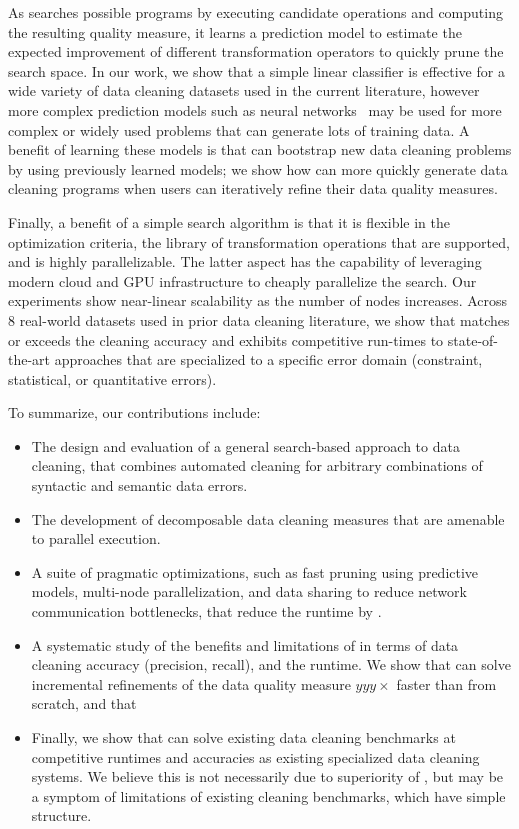 As \sys searches possible programs by executing candidate operations and computing the resulting quality measure, it learns a prediction model to estimate the expected improvement of different transformation operators to quickly prune the search space.  In our work, we show that a simple linear classifier is effective for a wide variety of data cleaning datasets used in the current literature, however more complex prediction models such as neural networks~\cite{} may be used for more complex or widely used problems that can generate lots of training data.   A benefit of learning these models is that \sys can bootstrap new data cleaning problems by using previously learned models; we show how \sys can more quickly generate data cleaning programs when users can iteratively refine their data quality measures.

Finally, a benefit of a simple search algorithm is that it is flexible in the optimization criteria, the library of transformation operations that are supported, and is highly parallelizable.  The latter aspect has the capability of leveraging modern cloud and GPU infrastructure to cheaply parallelize the search.  Our experiments show near-linear scalability as the number of nodes increases.
Across 8 real-world datasets used in prior data cleaning literature, we show that \sys matches or exceeds the cleaning accuracy and exhibits competitive run-times to state-of-the-art approaches that are specialized to a specific error domain (constraint, statistical, or quantitative errors).  


To summarize, our contributions include:
\begin{itemize}[leftmargin=*, topsep=0mm, itemsep=0mm]
  \item The design and evaluation of a general search-based approach to data cleaning, that combines automated cleaning for arbitrary combinations of syntactic and semantic data errors.
  \item The development of decomposable data cleaning measures that are amenable to parallel execution.
  \item A suite of pragmatic optimizations, such as fast pruning using predictive models, multi-node parallelization, and data sharing to reduce network communication bottlenecks, that reduce the runtime by .
  \item A systematic study of the benefits and limitations of \sys in terms of data cleaning accuracy (precision, recall), and the runtime.  We show that \sys can solve incremental refinements of the data quality measure $yyy\times$ faster than from scratch, and that 
  \item Finally, we show that \sys can solve existing data cleaning benchmarks at competitive runtimes and accuracies as existing specialized data cleaning systems.  We believe this is not necessarily due to superiority of \sys, but may be a symptom of limitations of existing cleaning benchmarks, which have simple structure.

\end{itemize}


